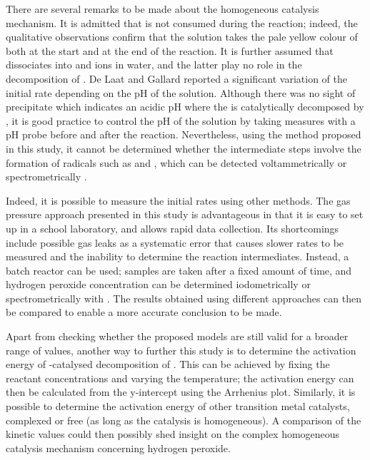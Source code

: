 \documentclass[a4paper, 12pt]{article}
\begin{document}
There are several remarks to be made about the homogeneous catalysis mechanism. It is admitted that  is not consumed during the reaction; indeed, the qualitative observations confirm that the solution takes the pale yellow colour of  both at the start and at the end of the reaction. It is further assumed that  dissociates into  and  ions in water, and the latter play no role in the decomposition of . De Laat and Gallard \cite{de_laat} reported a significant variation of the initial rate depending on the pH of the solution. Although there was no sight of  precipitate which indicates an acidic pH where the  is catalytically decomposed by  \cite{de_laat}, it is good practice to control the pH of the solution by taking measures with a pH probe before and after the reaction. Nevertheless, using the method proposed in this study, it cannot be determined whether the intermediate steps involve the formation of radicals such as  and  \cite{detection} \cite{de_laat} \cite{tachiev}, which can be detected voltammetrically \cite{detection} or spectrometrically \cite{de_laat}. 

Indeed, it is possible to measure the initial rates using other methods. The gas pressure approach presented in this study is advantageous in that it is easy to set up in a school laboratory, and allows rapid data collection. Its shortcomings include possible gas leaks as a systematic error that causes slower rates to be measured and the inability to determine the reaction intermediates. Instead, a batch reactor can be used; samples are taken after a fixed amount of time, and hydrogen peroxide concentration can be determined iodometrically or spectrometrically with  \cite{de_laat}. The results obtained using different approaches can then be compared to enable a more accurate conclusion to be made.

Apart from checking whether the proposed models are still valid for a broader range of \ce{[H2O2]} values, another way to further this study is to determine the activation energy of -catalysed decomposition of . This can be achieved by fixing the reactant concentrations and varying the temperature; the activation energy can then be calculated from the y-intercept using the Arrhenius plot. Similarly, it is possible to determine the activation energy of other transition metal catalysts, complexed or free (as long as the catalysis is homogeneous). A comparison of the kinetic values could then possibly shed insight on the complex homogeneous catalysis mechanism concerning hydrogen peroxide.

\clearpage
\thispagestyle{empty}
\printbibliography
\thispagestyle{empty}
\end{document}
